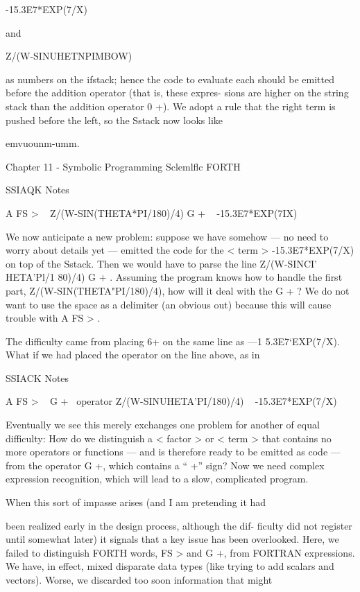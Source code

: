-15.3E7*EXP(7/X)

and

Z/(W-SINUHETNPIMBOW)

as numbers on the ifstack; hence the code to evaluate each should
be emitted before the addition operator (that is, these expres-
sions are higher on the string stack than the addition operator
0 +). We adopt a rule that the right term is pushed before the
left, so the Sstack now looks like

emvuounm-umm.

Chapter 11 - Symbolic Programming Sclemlﬂc FORTH

 

SSIAQK Notes

A FS > \ < subject >
Z/(W-SIN(THETA*PI/180)/4) G + \ <term >
-15.3E7*EXP(7IX) \ < term >

We now anticipate a new problem: suppose we have somehow —
no need to worry about details yet — emitted the code for the
< term > -15.3E7*EXP(7/X) on top of the Sstack. Then we
would have to parse the line Z/(W-SINCI’ HETA'Pl/1 80)/4) G + .
Assuming the program knows how to handle the first part,
Z/(W-SIN(THETA"PI/180)/4), how will it deal with the G + ?
We do not want to use the space as a delimiter (an obvious out)
because this will cause trouble with A FS > .

The difficulty came from placing 6+ on the same line as
—1 5.3E7‘EXP(7/X). What if we had placed the operator on the
line above, as in

 

SSIACK Notes

A FS > \ < subject >
G + \ operator
Z/(W-SINUHETA'PI/180)/4) \ < term >
-15.3E7*EXP(7/X) \ < term >

Eventually we see this merely exchanges one problem for another
of equal difficulty: How do we distinguish a < factor > or
< term > that contains no more operators or functions — and is
therefore ready to be emitted as code — from the operator G +,
which contains a “ +” sign? Now we need complex expression
recognition, which will lead to a slow, complicated program.

When this sort of impasse arises (and I am pretending it had

been realized early in the design process, although the dif-
ficulty did not register until somewhat later) it signals that a key
issue has been overlooked. Here, we failed to distinguish FORTH
words, FS > and G +, from FORTRAN expressions. We have, in
effect, mixed disparate data types (like trying to add scalars and
vectors). Worse, we discarded too soon information that might

